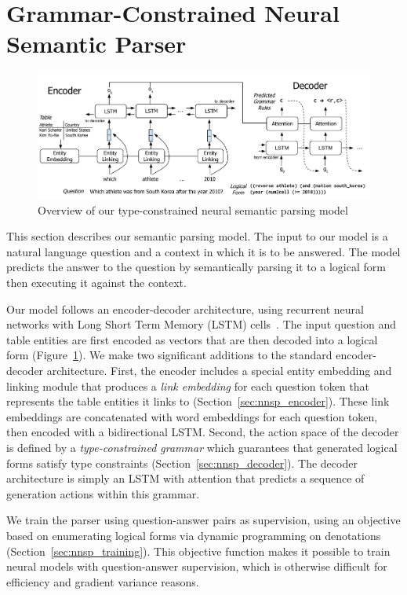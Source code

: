 \section{Grammar-Constrained Neural Semantic Parser}
\begin{figure}
\centering
\includegraphics[width=6in]{figures/type_constrained_nnsp.png}
\caption{Overview of our type-constrained neural semantic parsing model}\label{fig:nnsp_model}
\end{figure}

This section describes our semantic parsing model.
The input to our model is a natural language question and a context in which it 
is to be answered.
The model predicts the answer to the question by semantically parsing it to a 
logical form then executing it against the context.

Our model follows an encoder-decoder architecture, using recurrent neural 
networks with Long Short Term Memory (LSTM) cells~\citep{hochreiter1997long}. 
The input question and table entities are first encoded as vectors that are 
then decoded into a logical form (Figure~\ref{fig:nnsp_model}).
We make two significant additions to the standard encoder-decoder architecture.
First, the encoder includes a special entity embedding and linking module that 
produces a \emph{link embedding} for each question token that represents the 
table entities it links to (Section~\ref{sec:nnsp_encoder}).
These link embeddings are concatenated with word embeddings for each question 
token, then encoded with a bidirectional LSTM\@.
Second, the action space of the decoder is defined by a \emph{type-constrained 
grammar} which guarantees that generated logical forms satisfy type constraints 
(Section~\ref{sec:nnsp_decoder}).
The decoder architecture is simply an LSTM with attention that predicts a 
sequence of generation actions within this grammar.

We train the parser using question-answer pairs as supervision, using an 
objective based on enumerating logical forms via dynamic programming on 
denotations \citep{pasupat2016inferring} (Section~\ref{sec:nnsp_training}). This 
objective function makes it possible to train neural models with 
question-answer supervision, which is otherwise difficult for efficiency and 
gradient variance reasons.

